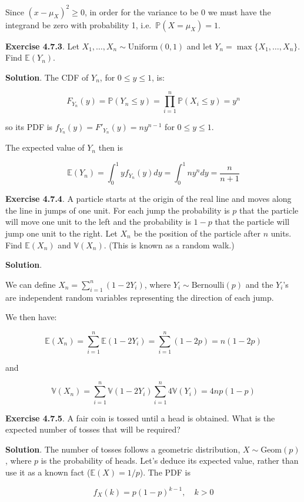 Since \((x - \mu_X)^2 \geq 0\), in order for the variance to be 0 we
must have the integrand be zero with probability 1,
i.e.~\(\mathbb{P}(X = \mu_X) = 1\).

\textbf{Exercise 4.7.3}. Let
\(X_1, \dots, X_n \sim \text{Uniform}(0, 1)\) and let
\(Y_n = \max \{ X_1, \dots, X_n \}\). Find \(\mathbb{E}(Y_n)\).

\textbf{Solution}. The CDF of \(Y_n\), for \(0 \leq y \leq 1\), is:

\[ F_{Y_n}(y) = \mathbb{P}(Y_n \leq y) = \prod_{i=1}^n \mathbb{P}(X_i \leq y) = y^n \]

so its PDF is \(f_{Y_n}(y) = F'_{Y_n}(y) = n y^{n-1}\) for
\(0 \leq y \leq 1\).

The expected value of \(Y_n\) then is

\[ \mathbb{E}(Y_n) = \int_0^1 y f_{Y_n}(y) dy = \int_0^1 n y^n dy = \frac{n}{n+1} \]

\textbf{Exercise 4.7.4}. A particle starts at the origin of the real
line and moves along the line in jumps of one unit. For each jump the
probability is \(p\) that the particle will move one unit to the left
and the probability is \(1 - p\) that the particle will jump one unit to
the right. Let \(X_n\) be the position of the particle after \(n\)
units. Find \(\mathbb{E}(X_n)\) and \(\mathbb{V}(X_n)\). (This is known
as a random walk.)

\textbf{Solution}.

We can define \(X_n = \sum_{i=1}^n (1 - 2Y_i)\), where
\(Y_i \sim \text{Bernoulli}(p)\) and the \(Y_i\)'s are independent
random variables representing the direction of each jump.

We then have:

\[ \mathbb{E}(X_n) = \sum_{i=1}^n \mathbb{E}(1 - 2Y_i) = \sum_{i=1}^n (1 - 2p) = n(1 - 2p) \]

and

\[ \mathbb{V}(X_n) = \sum_{i=1}^n \mathbb{V}(1 - 2Y_i) \sum_{i=1}^n 4\mathbb{V}(Y_i) = 4np(1 - p) \]

\textbf{Exercise 4.7.5}. A fair coin is tossed until a head is obtained.
What is the expected number of tosses that will be required?

\textbf{Solution}. The number of tosses follows a geometric
distribution, \(X \sim \text{Geom}(p)\), where \(p\) is the probability
of heads. Let's deduce its expected value, rather than use it as a known
fact (\(\mathbb{E}(X) = 1/p\)). The PDF is

\[ f_X(k) = p (1 - p)^{k - 1}, \quad k > 0 \]


